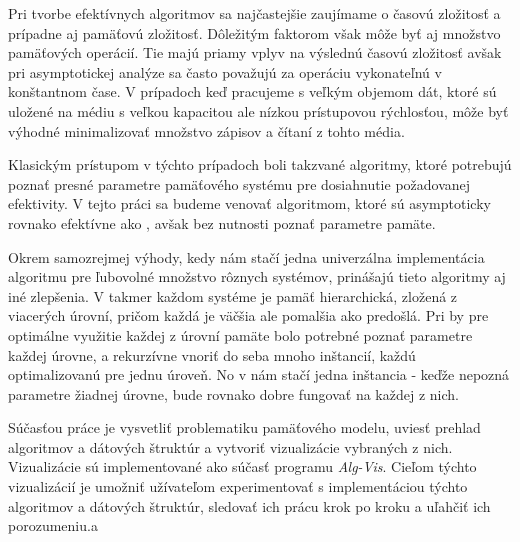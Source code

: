 
Pri tvorbe efektívnych algoritmov sa najčastejšie zaujímame o časovú zložitosť a prípadne aj pamäťovú zložitosť. Dôležitým faktorom však môže byť aj množstvo pamäťových operácií. Tie majú priamy vplyv na výslednú časovú zložitosť avšak pri asymptotickej analýze sa často považujú za operáciu vykonateľnú v konštantnom čase. V prípadoch keď pracujeme s veľkým objemom dát, ktoré sú uložené na médiu s veľkou kapacitou ale nízkou prístupovou rýchlosťou, môže byť výhodné minimalizovať množstvo zápisov a čítaní z tohto média.

Klasickým prístupom v týchto prípadoch boli takzvané \aware algoritmy, ktoré potrebujú poznať presné parametre pamäťového systému pre dosiahnutie požadovanej efektivity. V tejto práci sa budeme venovať \obliv algoritmom, ktoré sú asymptoticky rovnako efektívne ako \aware, avšak bez nutnosti poznať parametre pamäte.

Okrem samozrejmej výhody, kedy nám stačí jedna univerzálna implementácia algoritmu pre ľubovolné množstvo rôznych systémov, prinášajú tieto algoritmy aj iné zlepšenia. V takmer každom systéme je pamäť hierarchická, zložená z viacerých úrovní, pričom každá je väčšia ale pomalšia ako predošlá. Pri \aware by pre optimálne využitie každej z úrovní pamäte bolo potrebné poznať parametre každej úrovne, a rekurzívne vnoriť do seba mnoho inštancií, každú optimalizovanú pre jednu úroveň. No v \obliv nám stačí jedna inštancia - keďže nepozná parametre žiadnej úrovne, bude rovnako dobre fungovať na každej z nich.

Súčasťou práce je vysvetliť problematiku \obliv pamäťového modelu, uviesť prehlad algoritmov a dátových štruktúr a vytvoriť vizualizácie vybraných z nich. Vizualizácie sú implementované ako súčasť programu {\em Alg-Vis}. Cieľom týchto vizualizácií je umožniť užívateľom experimentovať s implementáciou týchto algoritmov a dátových štruktúr, sledovať ich prácu krok po kroku a uľahčiť ich porozumeniu.a